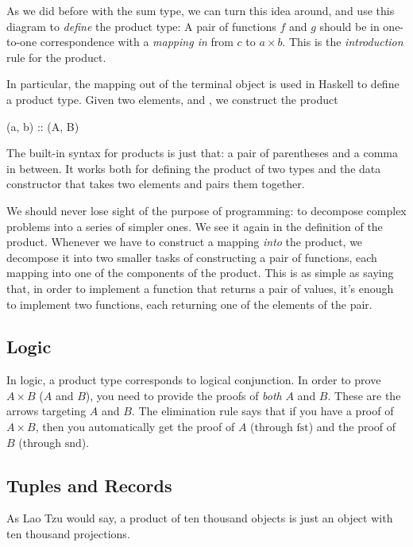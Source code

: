 \documentclass[DaoFP]{subfiles}
\begin{document}
As we did before with the sum type, we can turn this idea around, and use this diagram to \emph{define} the product type: A pair of functions $f$ and $g$ should be in one-to-one correspondence with a \emph{mapping in} from $c$ to $a \times b$. This is the \emph{introduction} rule for the product.

In particular, the mapping out of the terminal object is used in Haskell to define a product type. Given two elements,  and , we construct the product 

\begin{haskell}
(a, b) :: (A, B)
\end{haskell}
The built-in syntax for products is just that: a pair of parentheses and a comma in between. It works both for defining the product of two types  and the data constructor  that takes two elements and pairs them together. 

We should never lose sight of the purpose of programming: to decompose complex problems into a series of simpler ones. We see it again in the definition of the product. Whenever we have to construct a mapping \emph{into} the product, we decompose it into two smaller tasks of constructing a pair of functions, each mapping into one of the components of the product. This is as simple as saying that, in order to implement a function that returns a pair of values, it's enough to implement two functions, each returning one of the elements of the pair.

\subsection{Logic}

In logic, a product type corresponds to logical conjunction. In order to prove $A \times B$ ($A$ and $B$), you need to provide the proofs of \emph{both} $A$ and $B$. These are the arrows targeting $A$ and $B$. The elimination rule says that if you have a proof of $A \times B$, then you automatically get the proof of $A$ (through $\text{fst}$) and the proof of $B$ (through $\text{snd}$).

\subsection{Tuples and Records}

As Lao Tzu would say, a product of ten thousand objects is just an object with ten thousand projections. 
\end{document}
